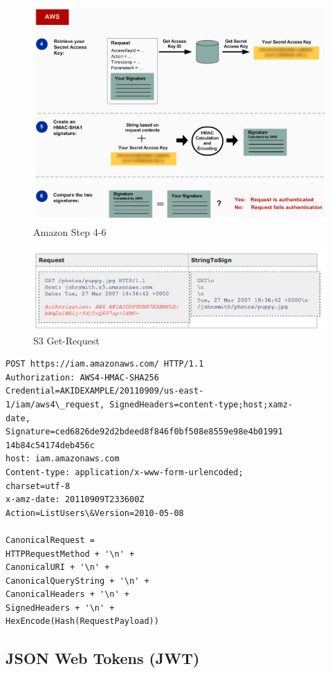 \begin{figure}[h!]
\centering
\includegraphics[width=0.6\linewidth]{fig/amazon-steps-4-6}
\caption{Amazon Step 4-6}
\label{fig:amazon-steps-4-6}
\end{figure}

\begin{figure}[h!]
\centering
\includegraphics[width=1\linewidth]{fig/s3getrequest}
\caption{S3 Get-Request}
\label{fig:s3getrequest}
\end{figure}

\newpage
\begin{lstlisting}[caption=S4 POST-Request mit Security Felder]
POST https://iam.amazonaws.com/ HTTP/1.1
Authorization: AWS4-HMAC-SHA256
Credential=AKIDEXAMPLE/20110909/us-east-
1/iam/aws4\_request, SignedHeaders=content-type;host;xamz-
date,
Signature=ced6826de92d2bdeed8f846f0bf508e8559e98e4b01991
14b84c54174deb456c
host: iam.amazonaws.com
Content-type: application/x-www-form-urlencoded;
charset=utf-8
x-amz-date: 20110909T233600Z
Action=ListUsers\&Version=2010-05-08

CanonicalRequest =
HTTPRequestMethod + '\n' +
CanonicalURI + '\n' +
CanonicalQueryString + '\n' +
CanonicalHeaders + '\n' +
SignedHeaders + '\n' +
HexEncode(Hash(RequestPayload))
\end{lstlisting}

\subsection{JSON Web Tokens (JWT)}

